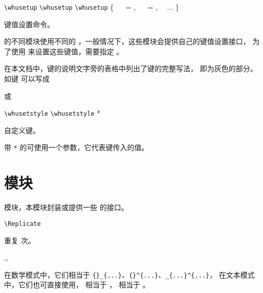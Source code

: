\documentclass[twoside]{book}
\begin{document}
\begin{function}{\whusetup}
\begin{syntax}
  \verb|\whusetup| 
  \verb|\whusetup|  
  \verb|\whusetup| \{
  ~~ =  ,
  ~~ =  ,
  ~~...
  \}
\end{syntax}
键值设置命令。

\WhuTeX 的不同模块使用不同的 ，一般情况下，这些模块会提供自己的键值设置接口，
为了使用  来设置这些键值，需要指定 。
\end{function}

在本文档中，键的说明文字旁的表格中列出了键的完整写法， 即为灰色的部分。
如键  可以写成 
\begin{xample}
或 
\stopxamplecode
\xamplecode\medskip
\end{xample}


\begin{function}{\whusetstyle}
\begin{syntax}
  \verb|\whusetstyle|     
  \verb|\whusetstyle| *   
\end{syntax}
自定义键。

带 \verb|*| 的可使用一个参数，它代表键传入的值。
\end{function}

\section{模块}

 模块，本模块封装或提供一些 \LaTeXe 的接口。

\begin{function}[EXP]{\Replicate}
\begin{syntax}
  \verb|\Replicate|  
\end{syntax}
重复   次。
\end{function}

\begin{function}{\lo,\hi,\lohi} 
  \begin{syntax}
    \V\lo   {}
    \V\hi   {}
    \V\lohi {} 
  \end{syntax}
在数学模式中，它们相当于 \verb|{}_{...}|、\verb|{}^{...}|、\verb|_{...}^{...}|，
在文本模式中，它们也可直接使用， 相当于 ，
 相当于 。
\end{function}
\end{document}
